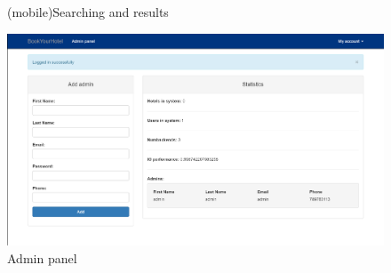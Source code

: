\documentclass{sig-alternate-05-2015}
\begin{document}
\begin{figure}[h]
\begin{minipage}[h]{0.49\linewidth}
	\end{minipage}
	\caption{(mobile)Searching and results}
	\label{search}
\end{figure}
\begin{figure}[h]
\centering
\includegraphics[width=1\linewidth]{adminpanel}
\caption{Admin panel}
\label{ap}
\end{figure}
\end{document}
